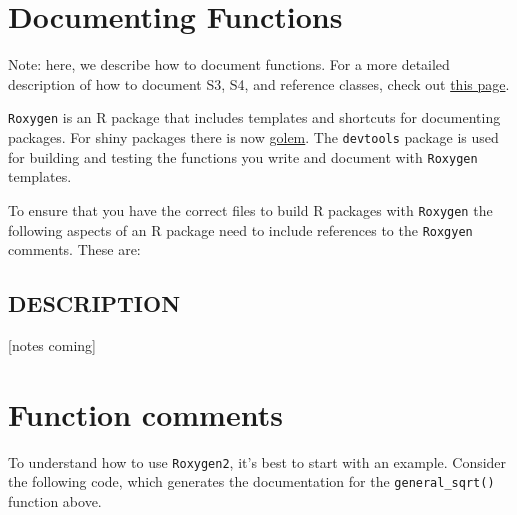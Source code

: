 \documentclass[
]{book}
\begin{document}
\hypertarget{documenting-functions}{%
\section{Documenting Functions}\label{documenting-functions}}

Note: here, we describe how to document functions. For a more detailed description of how to document S3, S4, and reference classes, check out \href{http://r-pkgs.had.co.nz/man.html}{this page}.

\texttt{Roxygen} is an R package that includes templates and shortcuts for documenting packages. For shiny packages there is now \href{https://engineering-shiny.org/golem.html}{golem}. The \texttt{devtools} package is used for building and testing the functions you write and document with \texttt{Roxygen} templates.

To ensure that you have the correct files to build R packages with \texttt{Roxygen} the following aspects of an R package need to include references to the \texttt{Roxgyen} comments. These are:

\hypertarget{description}{%
\subsection{DESCRIPTION}\label{description}}

{[}notes coming{]}

\hypertarget{function-comments}{%
\section{Function comments}\label{function-comments}}

To understand how to use \texttt{Roxygen2}, it's best to start with an example. Consider the following code, which generates the documentation for the \texttt{general\_sqrt()} function above.
\end{document}
